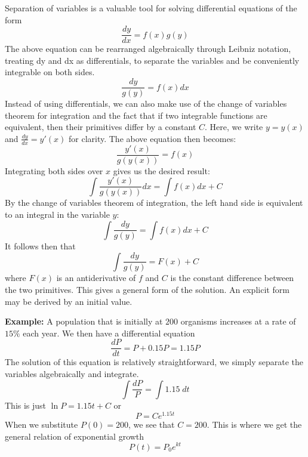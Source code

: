 \documentclass[12pt]{article}
\begin{document}
Separation of variables is a valuable tool for solving differential equations of the form
$$\frac{dy}{dx}=f(x)g(y)$$
The above equation can be rearranged algebraically through Leibniz notation, treating dy and dx as differentials, to separate the variables and be conveniently integrable on both sides.
$$\frac{dy}{g(y)}=f(x)dx$$
Instead of using differentials, we can also make use of the change of variables theorem for integration and the fact that if two integrable functions are equivalent, then their primitives differ by a constant $C$. Here, we write $y = y(x)$ and $\frac{dy}{dx} = y'(x)$ for clarity. The above equation then becomes:
$$\frac{y'(x)}{g(y(x))} = f(x)$$
Integrating both sides over $x$ gives us the desired result:
$$\int \frac{y'(x)}{g(y(x))} dx = \int f(x) dx + C$$
By the change of variables theorem of integration, the left hand side is equivalent to an integral in the variable $y$:
$$\int \frac{dy}{g(y)} = \int f(x) dx + C$$
It follows then that
$$\int\frac{dy}{g(y)} = F(x) + C$$
where $F(x)$ is an antiderivative of $f$ and $C$ is the constant difference between the two primitives. This gives a general form of the solution. An explicit form may be derived by an initial value.

\textbf{Example:} 
A population that is initially at $200$ organisms increases at a rate of $15\%$ each year. We then have a differential equation
$$\frac{dP}{dt} = P + 0.15P = 1.15P$$
The solution of this equation is relatively straightforward, we simply separate the variables algebraically and integrate.
$$\int \frac{dP}{P} = \int 1.15\;dt$$
This is just $\ln P = 1.15t + C$ or
$$P=Ce^{1.15t}$$
When we substitute $P(0)=200$, we see that $C=200$. This is where we get the general relation of exponential growth
$$P(t) = P_0e^{kt}$$

\end{document}
